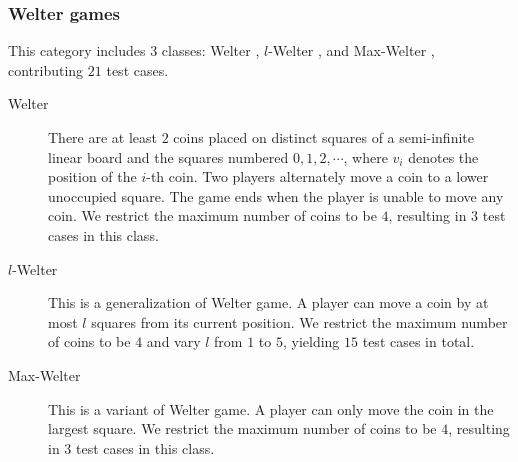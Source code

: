 \documentclass[review]{elsarticle}
\begin{document}
\subsubsection{Welter games}
This category includes $3$ classes: Welter \cite{Wel1952}, $l$-Welter \cite{KahF1987}, and Max-Welter \cite{Ho2014}, contributing $21$ test cases.
%

\begin{description}
	\item[Welter] There are at least $2$ coins placed on distinct squares of a semi-infinite linear board and the squares numbered $0, 1, 2, \cdots$, where $v_i$ denotes the position of the $i$-th coin.
	Two players alternately move a coin to a lower unoccupied square. 
	The game ends when the player is unable to move any coin.
	We restrict the maximum number of coins to be $4$, resulting in $3$ test cases in this class.
	
	\item[$l$-Welter] This is a generalization of Welter game.
	A player can move a coin by at most $l$ squares from its current position.
	We restrict the maximum number of coins to be $4$ and vary $l$ from $1$ to $5$, yielding $15$ test cases in total.
	
	\item[Max-Welter] This is a variant of Welter game.
	A player can only move the coin in the largest square.
	We restrict the maximum number of coins to be $4$, resulting in $3$ test cases in this class.
\end{description}

%
%
%
\end{document}
